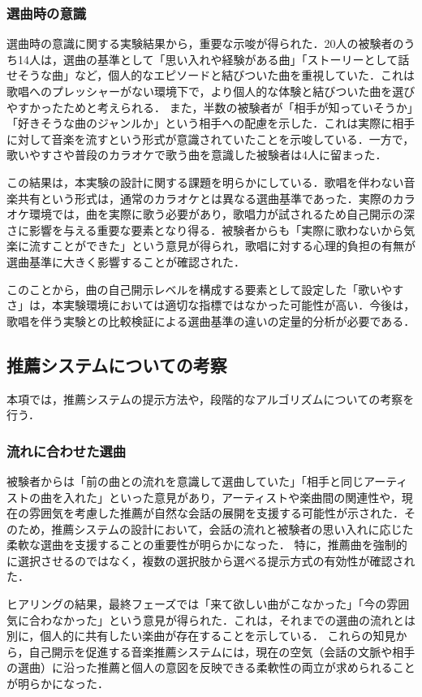 \subsubsection{選曲時の意識}
選曲時の意識に関する実験結果から，重要な示唆が得られた．20人の被験者のうち14人は，選曲の基準として「思い入れや経験がある曲」「ストーリーとして話せそうな曲」など，個人的なエピソードと結びついた曲を重視していた．これは歌唱へのプレッシャーがない環境下で，より個人的な体験と結びついた曲を選びやすかったためと考えられる．
また，半数の被験者が「相手が知っていそうか」「好きそうな曲のジャンルか」という相手への配慮を示した．これは実際に相手に対して音楽を流すという形式が意識されていたことを示唆している．一方で，歌いやすさや普段のカラオケで歌う曲を意識した被験者は4人に留まった．

この結果は，本実験の設計に関する課題を明らかにしている．歌唱を伴わない音楽共有という形式は，通常のカラオケとは異なる選曲基準であった．実際のカラオケ環境では，曲を実際に歌う必要があり，歌唱力が試されるため自己開示の深さに影響を与える重要な要素となり得る．被験者からも「実際に歌わないから気楽に流すことができた」という意見が得られ，歌唱に対する心理的負担の有無が選曲基準に大きく影響することが確認された．

このことから，曲の自己開示レベルを構成する要素として設定した「歌いやすさ」は，本実験環境においては適切な指標ではなかった可能性が高い．今後は，歌唱を伴う実験との比較検証による選曲基準の違いの定量的分析が必要である．



\subsection{推薦システムについての考察}

本項では，推薦システムの提示方法や，段階的なアルゴリズムについての考察を行う．

\subsubsection{流れに合わせた選曲}
被験者からは「前の曲との流れを意識して選曲していた」「相手と同じアーティストの曲を入れた」といった意見があり，アーティストや楽曲間の関連性や，現在の雰囲気を考慮した推薦が自然な会話の展開を支援する可能性が示された．そのため，推薦システムの設計において，会話の流れと被験者の思い入れに応じた柔軟な選曲を支援することの重要性が明らかになった．
特に，推薦曲を強制的に選択させるのではなく，複数の選択肢から選べる提示方式の有効性が確認された．

ヒアリングの結果，最終フェーズでは「来て欲しい曲がこなかった」「今の雰囲気に合わなかった」という意見が得られた．これは，それまでの選曲の流れとは別に，個人的に共有したい楽曲が存在することを示している．
これらの知見から，自己開示を促進する音楽推薦システムには，現在の空気（会話の文脈や相手の選曲）に沿った推薦と個人の意図を反映できる柔軟性の両立が求められることが明らかになった．


